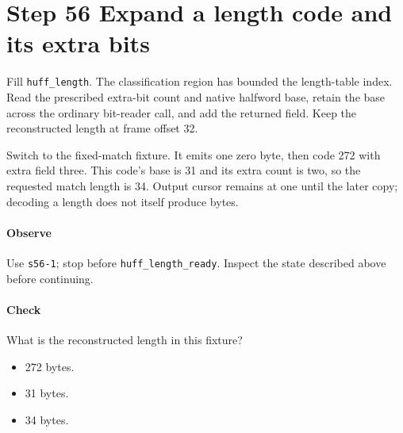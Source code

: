 \section{Step 56 Expand a length code and its extra bits}\label{png-huff-s56}
Fill \texttt{huff\_length}. The classification region has bounded the length-table index. Read the prescribed extra-bit count and native halfword base, retain the base across the ordinary bit-reader call, and add the returned field. Keep the reconstructed length at frame offset 32.

Switch to the fixed-match fixture. It emits one zero byte, then code 272 with extra field three. This code's base is 31 and its extra count is two, so the requested match length is 34. Output cursor remains at one until the later copy; decoding a length does not itself produce bytes.

\paragraph{Observe} Use \texttt{s56-1}; stop before \texttt{huff\_length\_ready}. Inspect the state described above before continuing.

\paragraph{Check} What is the reconstructed length in this fixture?
\begin{itemize}
\item[A.] 272 bytes.
\item[B.] 31 bytes.
\item[C.] 34 bytes.
\end{itemize}
